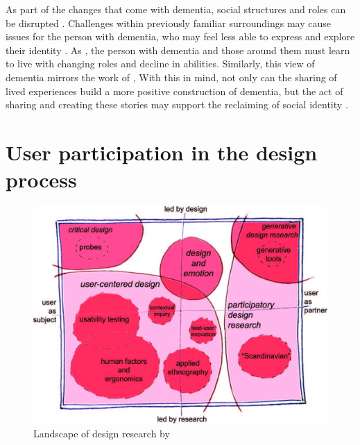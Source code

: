 As part of the changes that come with dementia, social structures and roles can be disrupted \citep{hampson_dementia:_2016}. Challenges within previously familiar surroundings may cause issues for the person with dementia, who may feel less able to express and explore their identity \citep{john_killick_claire_craig_creativity_2012}. As , the person with dementia and those around them must learn to live with changing roles and decline in abilities. Similarly, this view of dementia mirrors the work of \cite{kitwood1997dementia},  With this in mind, not only can the sharing of lived experiences build a more positive construction of dementia, but the act of sharing and creating these stories may support the reclaiming of social identity \citep{ryan_dementia_2009}.

\section{User participation in the design process}
\label{ParticipationDesignProcess}

\begin{figure}[htp]
    \centering
    \includegraphics[width=0.6\linewidth]{Images/Methodology/Landscape_of_Design.jpg}
    \caption{Landscape of design research by  \citeauthor{sanders2008co}}
    \label{fig:LandscapeOfDesign}
\end{figure}

